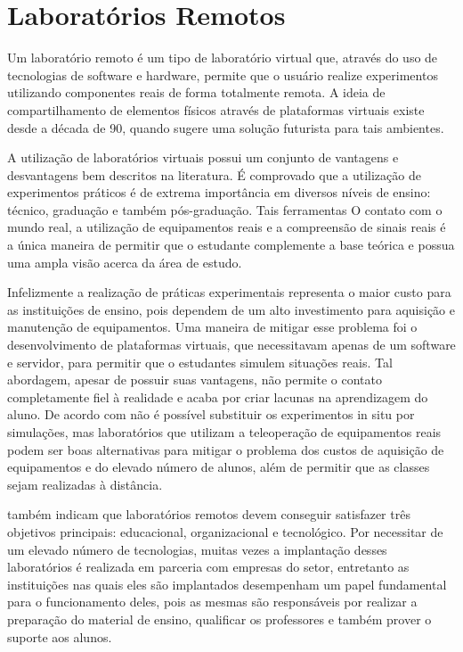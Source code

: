 \section{Laboratórios Remotos}
Um laboratório remoto é um tipo de laboratório virtual que, através do uso de tecnologias de software e hardware, permite que o usuário realize experimentos utilizando componentes reais de forma totalmente remota. A ideia de compartilhamento de elementos físicos através de plataformas virtuais existe desde a década de 90, quando  sugere uma solução futurista para tais ambientes. \cite{ferrero2003remlab}\par
A utilização de laboratórios virtuais possui um conjunto de vantagens e desvantagens bem descritos na literatura. É comprovado que a utilização de experimentos práticos é de extrema importância em diversos níveis de ensino: técnico, graduação e também pós-graduação. Tais ferramentas O contato com o mundo real, a utilização de equipamentos reais e a compreensão de sinais reais é a única maneira de permitir que o estudante complemente a base teórica e possua uma ampla visão acerca da área de estudo. \cite{kozik2012preparing}\cite{ferrero2003remlab} 
\par
Infelizmente a realização de práticas experimentais representa o maior custo para as instituições de ensino, pois dependem de um alto investimento para aquisição e manutenção de equipamentos. Uma maneira de mitigar esse problema foi o desenvolvimento de plataformas virtuais, que necessitavam apenas de um software e servidor, para permitir que o estudantes simulem situações reais. Tal abordagem, apesar de possuir suas vantagens, não permite o contato completamente fiel à realidade e acaba por criar lacunas na aprendizagem do aluno. \cite{ferrero2003remlab} De acordo com  não é possível substituir os experimentos in situ por simulações, mas laboratórios que utilizam a teleoperação de equipamentos reais podem ser boas alternativas para mitigar o problema dos custos de aquisição de equipamentos e do elevado número de alunos, além de permitir que as classes sejam realizadas à distância.
\par
{} também indicam que laboratórios remotos devem conseguir satisfazer três objetivos principais: educacional, organizacional e tecnológico. Por necessitar de um elevado número de tecnologias, muitas vezes a implantação desses laboratórios é realizada em parceria com empresas do setor, entretanto as instituições nas quais eles são implantados desempenham um papel fundamental para o funcionamento deles, pois as mesmas são responsáveis por realizar a preparação do material de ensino, qualificar os professores e também prover o suporte aos alunos. \cite{garcia2009addressing}
